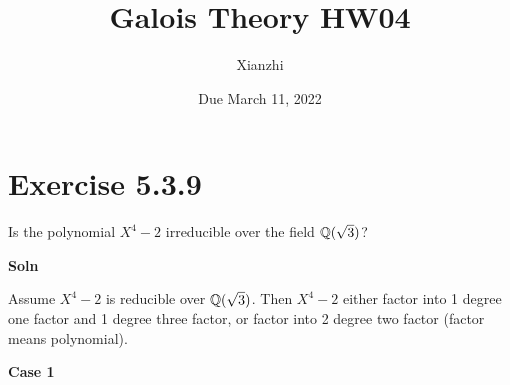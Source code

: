 \documentclass[12pt,english]{article}
\title{Galois Theory HW04}
\author{Xianzhi}
\date{Due March 11, 2022}
\begin{document}
\maketitle

\section*{Exercise 5.3.9}
\begin{question}
    Is the polynomial $X^4 -2$ irreducible over the field $\mathbb{Q}(\sqrt{3})$?
\end{question}

\textbf{Soln}

Assume $X^4 - 2$ is reducible over $\mathbb{Q}(\sqrt{3})$.
Then $X^4 -2$ either factor into 1 degree one factor and 1 degree three factor, or 
factor into 2 degree two factor (factor means polynomial).

\textbf{Case 1}
\end{document}
